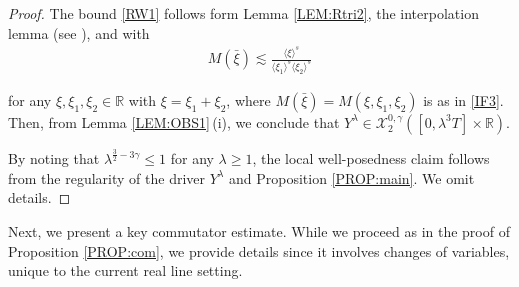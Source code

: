 \documentclass[letterpaper, 11pt,  reqno]{amsart}
\newcommand{\1}{\hspace{0.5mm}\text{I}\hspace{0.5mm}}
\newcommand{\noi}{\noindent}
\newcommand{\R}{\mathbb{R}}
\newcommand{\g}{\gamma}
\newcommand{\ld}{\lambda}
\newcommand{\les}{\lesssim}
\newcommand{\jb}[1]
{\langle #1 \rangle}
\newcommand{\cX}{\mathcal{X}}
\numberwithin{equation}{section}
\numberwithin{theorem}{section}
\begin{document}
\begin{proof}

The bound \eqref{RW1}
follows form Lemma \ref{LEM:Rtri2}, 
 the interpolation lemma (see \cite[Lemma~12.1]{CKSTT04}),
 and 
 with 
\begin{align*}
 M (\bar \xi) \les  \frac{\jb{\xi}^{s}}{\jb{\xi_1}^{s}\jb{\xi_2}^{s}}
\end{align*}

\noi
for any
$\xi, \xi_1, \xi_2 \in \R$
with $\xi = \xi_1 + \xi_2$, 
where $ M (\bar \xi) =  M (\xi, \xi_1, \xi_2)$
is as in \eqref{IF3}.
 Then, from 
 Lemma  \ref{LEM:OBS1}\,(i), 
 we conclude that 
$Y^\ld \in  \cX^{0, \g}_2([0, \ld^3T] \times \R)$.


By noting that 
$ \ld^{ \frac32  -3\g} \le 1$
for any $\ld \ge 1$, 
the local well-posedness claim 
follows
from the regularity of the driver $Y^\ld$ and Proposition \ref{PROP:main}.
We omit details.
\end{proof}








Next, we present a key 
commutator estimate.
While we proceed as in the proof of 
Proposition \ref{PROP:com}, 
we provide details
since it involves changes of variables, 
unique to the current real line setting.
\end{document}
